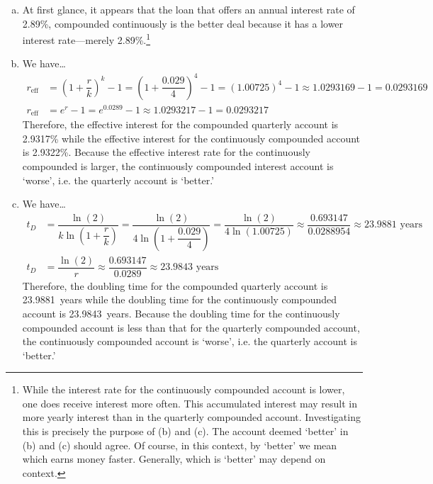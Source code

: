 \documentclass[11pt,letterpaper]{article}
\begin{document}
\sol 
\begin{enumerate}[(a)]
\item At first glance, it appears that the loan that offers an annual interest rate of 2.89\%, compounded continuously is the better deal because it has a lower interest rate---merely 2.89\%.\footnote{While the interest rate for the continuously compounded account is lower, one does receive interest more often. This accumulated interest may result in more yearly interest than in the quarterly compounded account. Investigating this is precisely the purpose of (b) and (c). The account deemed `better' in (b) and (c) should agree. Of course, in this context, by `better' we mean which earns money faster. Generally, which is `better' may depend on context.} \pspace

\item We have\dots
	\[
	\begin{aligned}
	r_{\text{eff}}&= \left(1 + \dfrac{r}{k} \right)^k - 1=  \left(1 + \dfrac{0.029}{4} \right)^4 - 1= (1.00725)^4 - 1 \approx 1.0293169 - 1= 0.0293169 \\
	r_{\text{eff}}&= e^r - 1= e^{0.0289} - 1 \approx 1.0293217 - 1= 0.0293217
	\end{aligned}
	\]
Therefore, the effective interest for the compounded quarterly account is 2.9317\% while the effective interest for the continuously compounded account is 2.9322\%. Because the effective interest rate for the continuously compounded is larger, the continuously compounded interest account is `worse', i.e. the quarterly account is `better.' \pspace

\item We have\dots
	\[
	\begin{aligned}
	t_D&= \dfrac{\ln(2)}{k \ln \left(1 + \dfrac{r}{k} \right)}= \dfrac{\ln(2)}{4 \ln \left(1 + \dfrac{0.029}{4} \right)}= \dfrac{\ln(2)}{4 \ln(1.00725)} \approx \dfrac{0.693147}{0.0288954} \approx 23.9881 \text{ years} \\
	t_D&= \dfrac{\ln(2)}{r} \approx \dfrac{0.693147}{0.0289} \approx 23.9843 \text{ years}
	\end{aligned}
	\]
Therefore, the doubling time for the compounded quarterly account is 23.9881~years while the doubling time for the continuously compounded account is 23.9843~years. Because the doubling time for the continuously compounded account is less than that for the quarterly compounded account, the continuously compounded account is `worse', i.e. the quarterly account is `better.' 
\end{enumerate}
\end{document}
